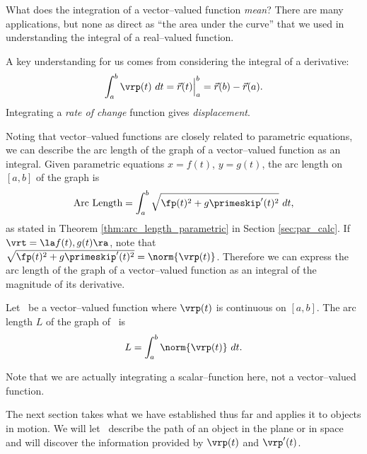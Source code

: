 What does the integration of a vector--valued function \emph{mean}? There are many applications, but none as direct as ``the area under the curve'' that we used in understanding the integral of a real--valued function.

A key understanding for us comes from considering the integral of a derivative: $$\int_a^b \vrp(t)\ dt = \vec r(t)\Big|_a^b = \vec r(b)-\vec r(a).$$ Integrating a \emph{rate of change} function gives \emph{displacement}.

Noting that vector--valued functions are closely related to parametric equations, we can describe the arc length of the graph of a vector--valued function as an integral. Given parametric equations $x=f(t)$, $y=g(t)$, the arc length on $[a,b]$ of the graph is
$$\text{Arc Length} = \int_a^b\sqrt{\fp(t)^2+g\primeskip'(t)^2}\ dt,$$
as stated in Theorem \ref{thm:arc_length_parametric} in Section \ref{sec:par_calc}. If $\vrt = \la f(t), g(t)\ra$, note that $\sqrt{\fp(t)^2+g\primeskip'(t)^2} = \norm{\vrp(t)}$. Therefore we can express the arc length of the graph of a vector--valued function as an integral of the magnitude of its derivative.

{Let \vrt\ be a vector--valued function where $\vrp(t)$ is continuous on $[a,b]$. The arc length $L$ of the graph of \vrt\ is 
$$L = \int_a^b \norm{\vrp(t)}\ dt.$$
}

Note that we are actually integrating a scalar--function here, not a vector--valued function.

The next section takes what we have established thus far and applies it to objects in motion. We will let \vrt\ describe the path of an object in the plane or in space and will discover the information provided by $\vrp(t)$ and $\vrp'(t)$.

